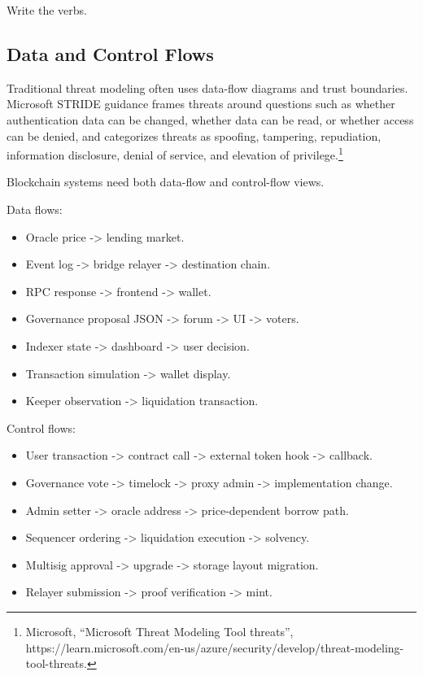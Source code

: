 Write the verbs.

\subsection{Data and Control Flows}

Traditional threat modeling often uses data-flow diagrams and trust
boundaries. Microsoft STRIDE guidance frames threats around questions
such as whether authentication data can be changed, whether data can be
read, or whether access can be denied, and categorizes threats as
spoofing, tampering, repudiation, information disclosure, denial of
service, and elevation of privilege.\footnote{Microsoft, ``Microsoft
  Threat Modeling Tool threats'',
  https://learn.microsoft.com/en-us/azure/security/develop/threat-modeling-tool-threats.}

Blockchain systems need both data-flow and control-flow views.

Data flows:

\begin{itemize}
\tightlist
\item
  Oracle price -\textgreater{} lending market.
\item
  Event log -\textgreater{} bridge relayer -\textgreater{} destination
  chain.
\item
  RPC response -\textgreater{} frontend -\textgreater{} wallet.
\item
  Governance proposal JSON -\textgreater{} forum -\textgreater{} UI
  -\textgreater{} voters.
\item
  Indexer state -\textgreater{} dashboard -\textgreater{} user decision.
\item
  Transaction simulation -\textgreater{} wallet display.
\item
  Keeper observation -\textgreater{} liquidation transaction.
\end{itemize}

Control flows:

\begin{itemize}
\tightlist
\item
  User transaction -\textgreater{} contract call -\textgreater{}
  external token hook -\textgreater{} callback.
\item
  Governance vote -\textgreater{} timelock -\textgreater{} proxy admin
  -\textgreater{} implementation change.
\item
  Admin setter -\textgreater{} oracle address -\textgreater{}
  price-dependent borrow path.
\item
  Sequencer ordering -\textgreater{} liquidation execution
  -\textgreater{} solvency.
\item
  Multisig approval -\textgreater{} upgrade -\textgreater{} storage
  layout migration.
\item
  Relayer submission -\textgreater{} proof verification -\textgreater{}
  mint.
\end{itemize}

